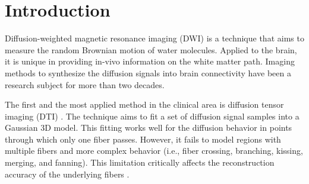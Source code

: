 \documentclass[twoside,twocolumn,10pt]{article}
\begin{document}

\section{Introduction}

\copyrightspace

Diffusion-weighted magnetic resonance imaging (DWI) is a technique that aims to measure the random Brownian motion of water molecules. Applied to the brain, it is unique in providing in-vivo information on the white matter path. Imaging methods to synthesize the diffusion signals into brain connectivity have been a research subject for more than two decades.

The first and the most applied method in the clinical area is diffusion tensor imaging (DTI) \cite{Basser1994}. The technique aims to fit a set of diffusion signal samples into a Gaussian 3D model.
This fitting works well for the diffusion behavior in points  through which only one fiber passes. However, it fails to model regions with multiple fibers and more complex behavior (i.e., fiber crossing, branching, kissing, merging, and fanning). This limitation critically affects the reconstruction accuracy of the underlying fibers \cite{descoteaux2015,SCHILLING2019194}.

\end{document}
